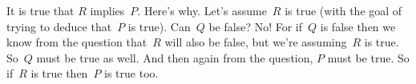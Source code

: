 It is true that $R$ implies~$P$. Here's why. Let's assume~$R$ is true (with the goal of trying to deduce that~$P$ is true). Can~$Q$ be false? No! For if~$Q$ is false then we know from the question that~$R$ will also be false, but we're assuming~$R$ is true. So~$Q$ must be true as well. And then again from the question, $P$ must be true. So if~$R$ is true then~$P$ is true too.
